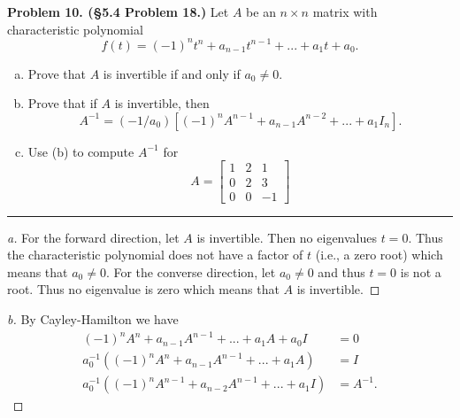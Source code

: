 \documentclass[leqno]{article}
\theoremstyle{nonumberplain}
\newtheorem{proof}{Proof}
\begin{document}
\noindent\textbf{Problem 10. (\S 5.4 Problem 18.)} Let $A$ be an $n\times n$ matrix with characteristic polynomial
\[
f(t)=(-1)^n t^n + a_{n-1}t^{n-1}+...+a_1 t + a_0.
\]
\begin{enumerate}[(a)]
\item Prove that $A$ is invertible if and only if $a_0\neq 0$.
\item Prove that if $A$ is invertible, then
\[
A^{-1}=(-1/a_0)[(-1)^n A^{n-1} + a_{n-1} A^{n-2} + ... + a_1 I_n].
\]
\item Use (b) to compute $A^{-1}$ for
\[
A=\begin{bmatrix}
1 & 2 & 1\\
0 & 2 & 3\\
0 & 0 & -1
\end{bmatrix}
\]
\end{enumerate}

\noindent\rule[0.5ex]{\linewidth}{1pt}

\begin{proof}[a]
For the forward direction, let $A$ is invertible. Then no eigenvalues $t=0$. Thus the characteristic polynomial does not have a factor of $t$ (i.e., a zero root) which means that $a_0\neq 0$. For the converse direction, let $a_0\neq 0$ and thus $t=0$ is not a root. Thus no eigenvalue is zero which means that $A$ is invertible.
\end{proof}

\begin{proof}[b]
By Cayley-Hamilton we have
\begin{align*}
(-1)^n A^n + a_{n-1}A^{n-1}+...+a_1 A +a_0 I&=0\\
a_0^{-1}((-1)^n A^n + a_{n-1} A^{n-1} + ... + a_1 A)&=I\\
a_0^{-1}((-1)^n A^{n-1} + a_{n-2} A^{n-1} + ... + a_1 I)&=A^{-1}.
\end{align*}
\end{proof}
\end{document}
